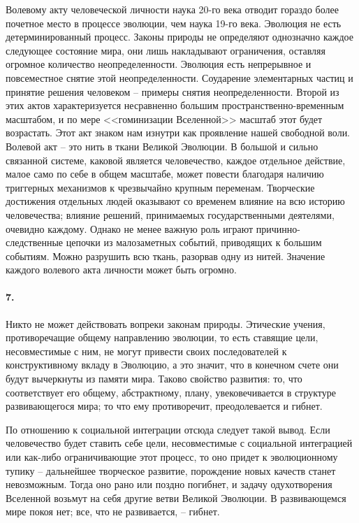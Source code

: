 \documentclass{book}
\begin{document}
Волевому акту человеческой личности наука 20-го века отводит гораздо более почетное место в процессе эволюции, чем наука 19-го века. Эволюция не есть детерминированный процесс. Законы природы не определяют однозначно каждое следующее состояние мира, они лишь накладывают ограничения, оставляя огромное количество неопределенности. Эволюция есть непрерывное и повсеместное снятие этой неопределенности. Соударение элементарных частиц и принятие решения человеком -- примеры снятия неопределенности. Второй из этих актов характеризуется несравненно большим пространственно-временным масштабом, и по мере <<гоминизации Вселенной>> масштаб этот будет возрастать. Этот акт знаком нам изнутри как проявление нашей свободной воли. Волевой акт -- это нить в ткани Великой Эволюции. В большой и сильно связанной системе, каковой является человечество, каждое отдельное действие, малое само по себе в общем масштабе, может повести благодаря наличию триггерных механизмов к чрезвычайно крупным переменам. Творческие достижения 
отдельных 
людей оказывают со временем влияние на всю историю человечества; влияние решений, принимаемых государственными деятелями, очевидно каждому. Однако не менее важную роль играют причинно-следственные цепочки из малозаметных событий, приводящих к большим событиям. Можно разрушить всю ткань, разорвав одну из нитей. Значение каждого волевого акта личности может быть огромно.

\paragraph{7.} Никто не может действовать вопреки законам природы. Этические учения, противоречащие общему направлению эволюции, то есть ставящие цели, несовместимые с ним, не могут привести своих последователей к конструктивному вкладу в Эволюцию, а это значит, что в конечном счете они будут вычеркнуты из памяти мира. Таково свойство развития: то, что соответствует его общему, абстрактному, плану, увековечивается в структуре развивающегося мира; то что ему противоречит, преодолевается и гибнет.

По отношению к социальной интеграции отсюда следует такой вывод. Если человечество будет ставить себе цели, несовместимые с социальной интеграцией или как-либо ограничивающие этот процесс, то оно придет к эволюционному тупику -- дальнейшее творческое развитие, порождение новых качеств станет невозможным. Тогда оно рано или поздно погибнет, и задачу одухотворения Вселенной возьмут на себя другие ветви Великой Эволюции. В развивающемся мире покоя нет; все, что не развивается, -- гибнет.
\end{document}
